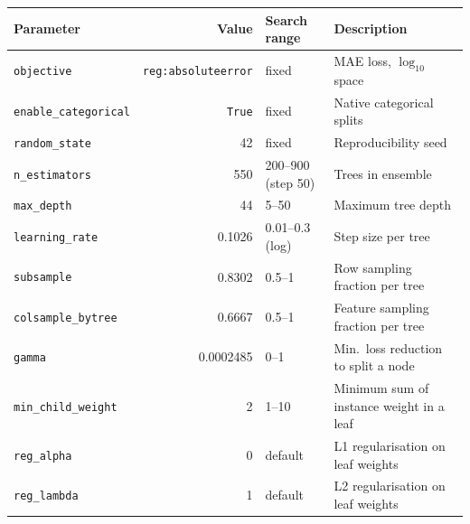 \begin{tabular}{lrlp{5.2cm}}
\toprule
Parameter & Value & Search range & Description \\
\midrule
\texttt{objective} & \texttt{reg:absoluteerror} & fixed & MAE loss, $\log_{10}$ space \\
\texttt{enable\_categorical} & \texttt{True} & fixed & Native categorical splits \\
\texttt{random\_state} & 42 & fixed & Reproducibility seed \\
\texttt{n\_estimators} & 550 & 200--900 (step 50) & Trees in ensemble \\
\texttt{max\_depth} & 44 & 5--50 & Maximum tree depth \\
\texttt{learning\_rate} & 0.1026 & 0.01--0.3 (log) & Step size per tree \\
\texttt{subsample} & 0.8302 & 0.5--1 & Row sampling fraction per tree \\
\texttt{colsample\_bytree} & 0.6667 & 0.5--1 & Feature sampling fraction per tree \\
\texttt{gamma} & 0.0002485 & 0--1 & Min.\ loss reduction to split a node \\
\texttt{min\_child\_weight} & 2 & 1--10 & Minimum sum of instance weight in a leaf \\
\texttt{reg\_alpha} & 0 & default & L1 regularisation on leaf weights \\
\texttt{reg\_lambda} & 1 & default & L2 regularisation on leaf weights \\
\bottomrule
\end{tabular}
